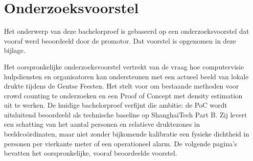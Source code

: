 \documentclass[dutch,dit,thesis]{hogentreport}
\begin{document}






%
%




\appendix

\chapter{Onderzoeksvoorstel}

Het onderwerp van deze bachelorproef is gebaseerd op een onderzoeksvoorstel dat vooraf werd beoordeeld door de promotor. Dat voorstel is opgenomen in deze bijlage.

Het oorspronkelijke onderzoeksvoorstel vertrekt van de vraag hoe computervisie hulpdiensten en organisatoren kan ondersteunen met een actueel beeld van lokale drukte tijdens de Gentse Feesten. Het stelt voor om bestaande methoden voor crowd counting te onderzoeken en een Proof of Concept met density estimation uit te werken. De huidige bachelorproef verfijnt die ambitie: de PoC wordt uitsluitend beoordeeld als technische baseline op ShanghaiTech Part B. Zij levert een schatting van het aantal personen en relatieve druktezones in beeldcoördinaten, maar niet zonder bijkomende kalibratie een fysieke dichtheid in personen per vierkante meter of een operationeel alarm. De volgende pagina's bevatten het oorspronkelijke, vooraf beoordeelde voorstel.






%


\backmatter{}

\setlength\bibitemsep{2pt} %
\printbibliography[heading=bibintoc]
\end{document}
